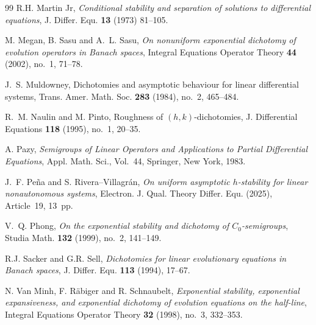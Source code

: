 \documentclass[10pt]{amsart}
\numberwithin{equation}{section}
\begin{document}
\begin{thebibliography}{99}
 R.H. Martin Jr,
\textit{Conditional stability and separation of solutions to differential equations}, 
J. Differ. Equ. \textbf{13} (1973) 81--105.


M. Megan, B. Sasu and A.~L. Sasu,
\textit{On nonuniform exponential dichotomy of evolution operators in Banach spaces},
Integral Equations Operator Theory \textbf{44} (2002), no.~1, 71--78.

J.~S. Muldowney, Dichotomies and asymptotic behaviour for linear differential systems, Trans. Amer. Math. Soc. {\bf 283} (1984), no.~2, 465--484.

 R.~M. Naulin and M. Pinto, Roughness of $(h,k)$-dichotomies, J. Differential Equations {\bf 118} (1995), no.~1, 20--35.

A. Pazy,
\textit{Semigroups of Linear Operators and Applications to Partial Differential Equations},
Appl. Math. Sci., Vol.~44, Springer, New York, 1983.

J.~F. Pe\~na and S. Rivera--Villagr\'an,
\textit{On uniform asymptotic $h$-stability for linear nonautonomous systems},
Electron. J. Qual. Theory Differ. Equ. (2025), Article~19, 13~pp.

V.~Q. Phong,
\textit{On the exponential stability and dichotomy of $C_{0}$-semigroups},
Studia Math. \textbf{132} (1999), no.~2, 141--149.

R.J. Sacker and G.R. Sell,
\textit{Dichotomies for linear evolutionary equations in Banach spaces},
J. Differ. Equ. \textbf{113} (1994), 17--67.

N. Van Minh, F. R\"abiger and R. Schnaubelt,
\textit{Exponential stability, exponential expansiveness, and exponential dichotomy of evolution equations on the half-line},
Integral Equations Operator Theory \textbf{32} (1998), no.~3, 332--353.

\end{thebibliography}
\end{document}
